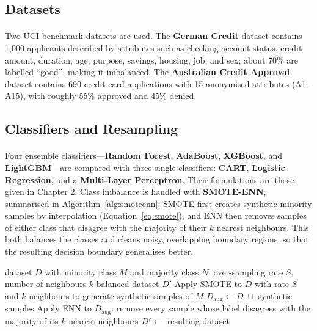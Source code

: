 \documentclass[12pt,a4paper,final]{extreport}
\begin{document}
\subsection{Datasets}

\paragraph{} Two UCI benchmark datasets are used. The \textbf{German Credit} dataset contains 1{,}000 applicants described by attributes such as checking account status, credit amount, duration, age, purpose, savings, housing, job, and sex; about 70\% are labelled ``good'', making it imbalanced. The \textbf{Australian Credit Approval} dataset contains 690 credit card applications with 15 anonymised attributes (A1--A15), with roughly 55\% approved and 45\% denied.

\subsection{Classifiers and Resampling}

\paragraph{} Four ensemble classifiers---\textbf{Random Forest}, \textbf{AdaBoost}, \textbf{XGBoost}, and \textbf{LightGBM}---are compared with three single classifiers: \textbf{CART}, \textbf{Logistic Regression}, and a \textbf{Multi-Layer Perceptron}. Their formulations are those given in Chapter 2. Class imbalance is handled with \textbf{SMOTE-ENN}, summarised in Algorithm~\ref{alg:smoteenn}: SMOTE first creates synthetic minority samples by interpolation (Equation~\ref{eq:smote}), and ENN then removes samples of either class that disagree with the majority of their $k$ nearest neighbours. This both balances the classes and cleans noisy, overlapping boundary regions, so that the resulting decision boundary generalises better.

\begin{algorithm}[htbp]
\caption{SMOTE-ENN resampling (adapted from \cite{p3})}\label{alg:smoteenn}
\begin{algorithmic}[1]
\Require dataset $D$ with minority class $M$ and majority class $N$, over-sampling rate $S$, number of neighbours $k$
\Ensure balanced dataset $D'$
\State Apply SMOTE to $D$ with rate $S$ and $k$ neighbours to generate synthetic samples of $M$
\State $D_{\mathrm{aug}}\gets D\;\cup$ synthetic samples
\State Apply ENN to $D_{\mathrm{aug}}$: remove every sample whose label disagrees with the majority of its $k$ nearest neighbours
\State \Return $D'\gets$ resulting dataset
\end{algorithmic}
\end{algorithm}
\end{document}
